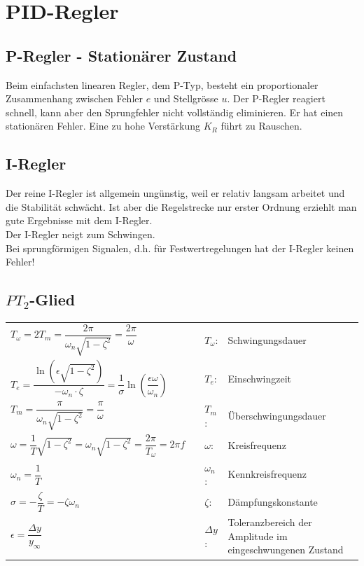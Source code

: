 \section{PID-Regler }

	\subsection{P-Regler - Stationärer Zustand }
		Beim einfachsten linearen Regler, dem P-Typ, besteht ein proportionaler
		Zusammenhang zwischen Fehler $e$ und Stellgrösse $u$.
		Der P-Regler reagiert schnell, kann aber den Sprungfehler nicht vollständig
		eliminieren. Er hat einen stationären Fehler. Eine zu hohe Verstärkung $K_R$ führt
    zu Rauschen.


	\subsection{I-Regler }
		Der reine I-Regler ist allgemein ungünstig, weil er relativ langsam arbeitet
		und die Stabilität schwächt. Ist aber die Regelstrecke nur erster Ordnung
		erziehlt man gute Ergebnisse mit dem I-Regler.\\
		Der I-Regler neigt zum Schwingen.\\
		Bei sprungförmigen Signalen, d.h. für Festwertregelungen hat der I-Regler
		keinen Fehler!


	\subsection{$PT_2$-Glied }
    \renewcommand{\arraystretch}{2}
    \begin{tabular}{|m{7cm}|m{1cm}m{0.5cm}m{8cm}}
      \cline{1-1}
        $T_\omega = 2T_m=\dfrac{2\pi}{\omega_n \sqrt{1-\zeta^2}}=\dfrac{2\pi}{\omega}$ & &
        $T_{\omega}$: & Schwingungsdauer \\
      \cline{1-1}
        $T_e = \dfrac{\ln\left(\epsilon\sqrt{1-\zeta^2}\right)}{-\omega_n\cdot\zeta} = 
        \dfrac{1}{\sigma}\ln\left(\dfrac{\epsilon\omega}{\omega_n}\right)$ & &
        $T_e$: & Einschwingzeit \\
      \cline{1-1}  
        $T_m = \dfrac{\pi}{\omega_n\sqrt{1-\zeta^2}}=\dfrac{\pi}{\omega}$ & &
        $T_m$: & Überschwingungsdauer\\
      \cline{1-1}  
        $\omega = \dfrac{1}{T}\sqrt{1-\zeta^2}= \omega_n\sqrt{1-\zeta^2}=\dfrac{2\pi}{T_\omega}=2\pi f$ & &
        $\omega$: & Kreisfrequenz \\
      \cline{1-1}  
        $\omega_n = \dfrac{1}{T}$ & &
        $\omega_n$: & Kennkreisfrequenz \\
      \cline{1-1}  
        $\sigma = -\dfrac{\zeta}{T} = -\zeta\omega_n$ & &
        $\zeta$: & Dämpfungskonstante \\
      \cline{1-1}  
        $\epsilon =  \dfrac{\Delta y}{y_{\infty}}$ & &
        $\Delta y$: & Toleranzbereich der Amplitude im eingeschwungenen Zustand \\
      \cline{1-1}
    \end{tabular}
    \renewcommand{\arraystretch}{1}

